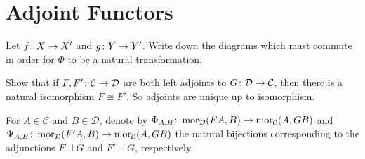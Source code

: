\bs

\es



\section{Adjoint Functors}

\bx
Let $f \colon X \to X'$ and $g \colon Y \to Y'$. Write down the diagrams which must commute in order for $\Phi$ to be a natural transformation.
\ex

\bs
\es

\begin{extra}
Show that if $F, F' \colon \mathcal{C} \to \mathcal{D}$ are both left adjoints to $G \colon \mathcal{D}\to\mathcal{C}$, then there is a natural isomorphism $F \cong F'$. So adjoints are unique up to isomorphism.
\end{extra}

\bs
For $A\in \mathcal{C}$ and $B\in\mathcal{D}$, denote by $\Phi_{A,B}\colon\operatorname{mor}_{\mathcal{D}}(FA,B)\to\operatorname{mor}_{\mathcal{C}}(A,GB)$ and $\Psi_{A,B}\colon\operatorname{mor}_{\mathcal{D}}(F'A,B)\to\operatorname{mor}_{\mathcal{C}}(A,GB)$ the natural bijections corresponding to the adjunctions $F\dashv G$ and $F'\dashv G$, respectively.


